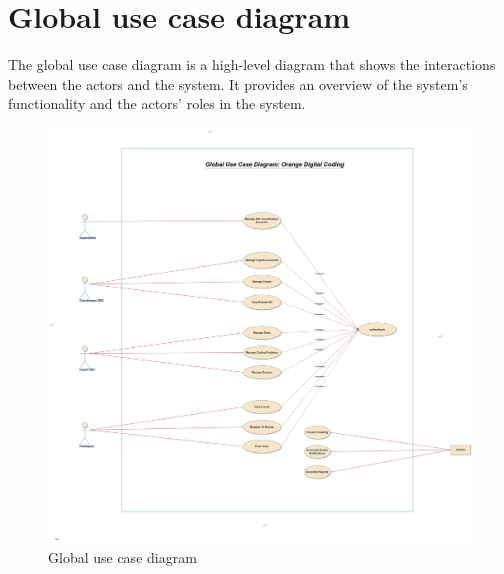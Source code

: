 \section{Global use case diagram}
The global use case diagram is a high-level diagram that shows the interactions
between the actors and the system. It provides an overview of the system's
functionality and the actors' roles in the system.
\begin{figure}[h!]
      \centering

      \includegraphics[height=1\textwidth]{images/useCaseGlobal.png}
      \caption{Global use case diagram}
      \label{fig:use_case_diagram}
\end{figure}


